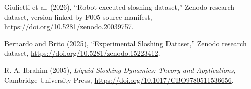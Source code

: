 Giulietti et al. (2026),
``Robot-executed sloshing dataset,''
Zenodo research dataset, version linked by F005 source manifest,
\url{https://doi.org/10.5281/zenodo.20039757}.

Bernardo and Brito (2025),
``Experimental Sloshing Dataset,''
Zenodo research dataset,
\url{https://doi.org/10.5281/zenodo.15223412}.

R. A. Ibrahim (2005),
\emph{Liquid Sloshing Dynamics: Theory and Applications},
Cambridge University Press,
\url{https://doi.org/10.1017/CBO9780511536656}.
